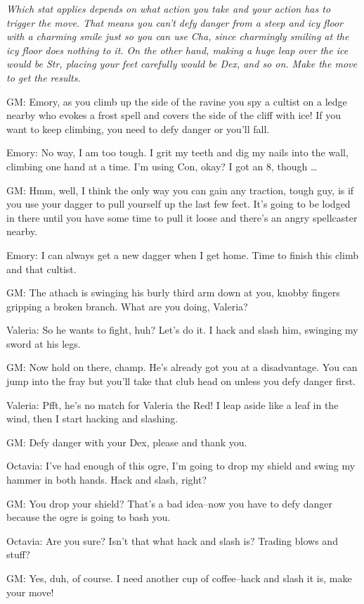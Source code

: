 {\itshape
 Which stat applies depends on what action you take and your action has to trigger the move. That means you can't defy danger from a steep and icy floor with a charming smile just so you can use Cha, since charmingly smiling at the icy floor does nothing to it. On the other hand, making a huge leap over the ice would be Str, placing your feet carefully would be Dex, and so on. Make the move to get the results.


 GM: Emory, as you climb up the side of the ravine you spy a cultist on a ledge nearby who evokes a frost spell and covers the side of the cliff with ice! If you want to keep climbing, you need to defy danger or you'll fall.


 Emory: No way, I am too tough. I grit my teeth and dig my nails into the wall, climbing one hand at a time. I'm using Con, okay? I got an 8, though \ldots 


 GM: Hmm, well, I think the only way you can gain any traction, tough guy, is if you use your dagger to pull yourself up the last few feet. It's going to be lodged in there until you have some time to pull it loose and there's an angry spellcaster nearby.


 Emory: I can always get a new dagger when I get home. Time to finish this climb and that cultist.


 GM: The athach is swinging his burly third arm down at you, knobby fingers gripping a broken branch. What are you doing, Valeria?


 Valeria: So he wants to fight, huh? Let's do it. I hack and slash him, swinging my sword at his legs.


 GM: Now hold on there, champ. He's already got you at a disadvantage. You can jump into the fray but you'll take that club head on unless you defy danger first.


 Valeria: Pfft, he's no match for Valeria the Red! I leap aside like a leaf in the wind, then I start hacking and slashing.


 GM: Defy danger with your Dex, please and thank you.


 Octavia: I've had enough of this ogre, I'm going to drop my shield and swing my hammer in both hands. Hack and slash, right?


 GM: You drop your shield? That's a bad idea--now you have to defy danger because the ogre is going to bash you.


 Octavia: Are you sure? Isn't that what hack and slash is? Trading blows and stuff?


 GM: Yes, duh, of course. I need another cup of coffee--hack and slash it is, make your move!
}
